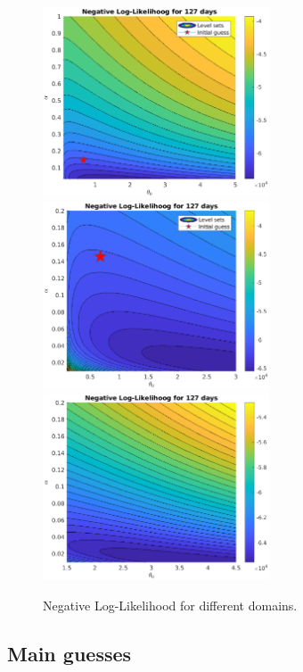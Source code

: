 \documentclass[11pt]{article}
\theoremstyle{definition}
\begin{document}
\begin{figure}[H]
\centering
\includegraphics[width=0.6\textwidth]{plots/likelihood/Log-Likelihood.eps}\quad\includegraphics[width=0.6\textwidth]{plots/likelihood/Log-Likelihood_refined.eps}
\includegraphics[width=0.6\textwidth]{plots/likelihood/Log-Likelihood_more_refined.eps}
\caption{Negative Log-Likelihood for different domains.}
\label{fig:neg-LL}
\end{figure}

\subsection{Main guesses}
\end{document}
